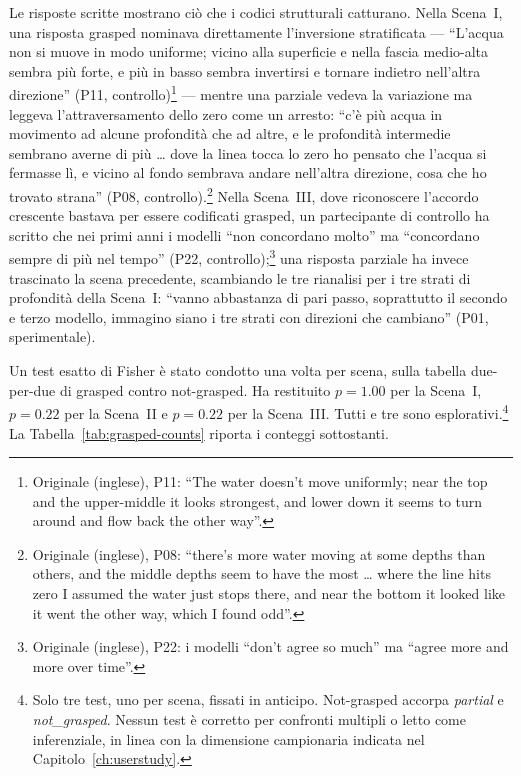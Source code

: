 Le risposte scritte mostrano ciò che i codici strutturali catturano. Nella Scena~I, una risposta grasped nominava direttamente l'inversione stratificata --- ``L'acqua non si muove in modo uniforme; vicino alla superficie e nella fascia medio-alta sembra più forte, e più in basso sembra invertirsi e tornare indietro nell'altra direzione'' (P11, controllo)\footnote{Originale (inglese), P11: ``The water doesn't move uniformly; near the top and the upper-middle it looks strongest, and lower down it seems to turn around and flow back the other way''.} --- mentre una parziale vedeva la variazione ma leggeva l'attraversamento dello zero come un arresto: ``c'è più acqua in movimento ad alcune profondità che ad altre, e le profondità intermedie sembrano averne di più \dots{} dove la linea tocca lo zero ho pensato che l'acqua si fermasse lì, e vicino al fondo sembrava andare nell'altra direzione, cosa che ho trovato strana'' (P08, controllo).\footnote{Originale (inglese), P08: ``there's more water moving at some depths than others, and the middle depths seem to have the most \dots{} where the line hits zero I assumed the water just stops there, and near the bottom it looked like it went the other way, which I found odd''.} Nella Scena~III, dove riconoscere l'accordo crescente bastava per essere codificati grasped, un partecipante di controllo ha scritto che nei primi anni i modelli ``non concordano molto'' ma ``concordano sempre di più nel tempo'' (P22, controllo);\footnote{Originale (inglese), P22: i modelli ``don't agree so much'' ma ``agree more and more over time''.} una risposta parziale ha invece trascinato la scena precedente, scambiando le tre rianalisi per i tre strati di profondità della Scena~I: ``vanno abbastanza di pari passo, soprattutto il secondo e terzo modello, immagino siano i tre strati con direzioni che cambiano'' (P01, sperimentale).

Un test esatto di Fisher è stato condotto una volta per scena, sulla tabella due-per-due di grasped contro not-grasped. Ha restituito $p = 1.00$ per la Scena~I, $p = 0.22$ per la Scena~II e $p = 0.22$ per la Scena~III. Tutti e tre sono esplorativi.\footnote{Solo tre test, uno per scena, fissati in anticipo. Not-grasped accorpa \emph{partial} e \emph{not\_grasped}. Nessun test è corretto per confronti multipli o letto come inferenziale, in linea con la dimensione campionaria indicata nel Capitolo~\ref{ch:userstudy}.} La Tabella~\ref{tab:grasped-counts} riporta i conteggi sottostanti.

